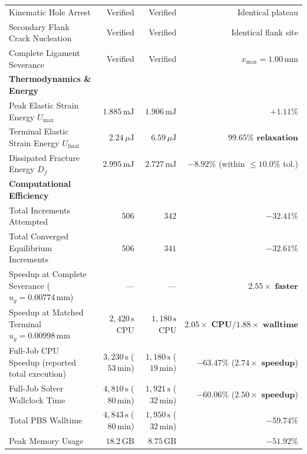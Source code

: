 \begin{table}[htbp]
\begin{tabularx}{\textwidth}{Xrrr}
Kinematic Hole Arrest & Verified & Verified & Identical plateau \\
Secondary Flank Crack Nucleation & Verified & Verified & Identical flank site \\
Complete Ligament Severance & Verified & Verified & $x_{\max} = 1.00\,\mathrm{mm}$ \\
\hline
\textbf{Thermodynamics \& Energy} & & & \\
Peak Elastic Strain Energy $U_{\max}$ & $1.885\,\mathrm{mJ}$ & $1.906\,\mathrm{mJ}$ & $+1.11\%$ \\
Terminal Elastic Strain Energy $U_{\mathrm{final}}$ & $2.24\,\mu\mathrm{J}$ & $6.59\,\mu\mathrm{J}$ & $\mathbf{99.65\%\text{ relaxation}}$ \\
Dissipated Fracture Energy $D_f$ & $2.995\,\mathrm{mJ}$ & $2.727\,\mathrm{mJ}$ & $-8.92\%$ (within $\le 10.0\%$ tol.) \\
\hline
\textbf{Computational Efficiency} & & & \\
Total Increments Attempted & $506$ & $342$ & $-32.41\%$ \\
Total Converged Equilibrium Increments & $506$ & $341$ & $-32.61\%$ \\
Speedup at Complete Severance ($u_y = 0.00774\,\mathrm{mm}$) & --- & --- & $\mathbf{2.55\times\text{ faster}}$ \\
Speedup at Matched Terminal $u_y = 0.00998\,\mathrm{mm}$ & $2{,}420\,\mathrm{s}$ CPU & $1{,}180\,\mathrm{s}$ CPU & $\mathbf{2.05\times\text{ CPU}} / \mathbf{1.88\times\text{ walltime}}$ \\
Full-Job CPU Speedup (reported total execution) & $3{,}230\,\mathrm{s}$ ($53\,\mathrm{min}$) & $1{,}180\,\mathrm{s}$ ($19\,\mathrm{min}$) & $\mathbf{-63.47\%}$ ($\mathbf{2.74\times\text{ speedup}}$) \\
Full-Job Solver Wallclock Time & $4{,}810\,\mathrm{s}$ ($80\,\mathrm{min}$) & $1{,}921\,\mathrm{s}$ ($32\,\mathrm{min}$) & $\mathbf{-60.06\%}$ ($\mathbf{2.50\times\text{ speedup}}$) \\
Total PBS Walltime & $4{,}843\,\mathrm{s}$ ($80\,\mathrm{min}$) & $1{,}950\,\mathrm{s}$ ($32\,\mathrm{min}$) & $\mathbf{-59.74\%}$ \\
Peak Memory Usage & $18.2\,\mathrm{GB}$ & $8.75\,\mathrm{GB}$ & $\mathbf{-51.92\%}$ \\
\hline
\end{tabularx}
\end{table}

